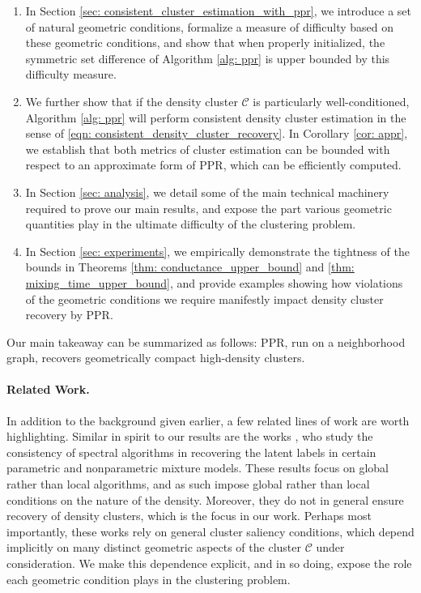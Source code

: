 \documentclass{article}
\newcommand{\1}{\mathbf{1}}
\newcommand{\Cset}{\mathcal{C}}
\newcommand{\ppr}{{\sc PPR}}
\theoremstyle{aldenthm}
\theoremstyle{aldenrmrk}
\begin{document}
\begin{enumerate}
	\item In Section \ref{sec: consistent_cluster_estimation_with_ppr}, we introduce a set of natural geometric conditions, formalize a measure of difficulty based on these geometric conditions, and show that when properly initialized, the symmetric set difference of Algorithm \ref{alg: ppr} is upper bounded by this difficulty measure.
	
	\item We further show that if the density cluster $\Cset$ is particularly well-conditioned, Algorithm \ref{alg: ppr} will perform consistent density cluster estimation in the sense of \eqref{eqn: consistent_density_cluster_recovery}. In Corollary \ref{cor: appr}, we establish that both metrics of cluster estimation can be bounded with respect to an approximate form of \ppr, which can be efficiently computed.
	
	\item In Section \ref{sec: analysis}, we detail some of the main technical machinery required to prove our main results, and expose the part various geometric quantities play in the ultimate difficulty of the clustering problem.
	
	\item In Section \ref{sec: experiments}, we empirically
	demonstrate the tightness of the bounds in Theorems \ref{thm: conductance_upper_bound} and \ref{thm: mixing_time_upper_bound}, and provide examples showing how violations of the geometric conditions we require manifestly
	impact density cluster recovery by \ppr.  
\end{enumerate}

Our main takeaway can be summarized as follows: \ppr, run on a neighborhood graph, recovers geometrically compact high-density clusters.

\paragraph{Related Work. }

In addition to the background given earlier, a few related lines of work are worth
highlighting. Similar in spirit to our results are the works
\citep{shi2009,schiebinger2015}, who study the consistency of
spectral algorithms in recovering the latent labels in certain parametric and
nonparametric mixture models. These results focus on global rather than local
algorithms, and as such impose global rather than local conditions on the nature
of the density. Moreover, they do not in general ensure recovery of density
clusters, which is the focus in our work. Perhaps most importantly, these works rely on general cluster saliency conditions, which depend implicitly on many distinct geometric aspects of the cluster $\Cset$ under consideration. We make this dependence explicit, and in so doing, expose the role each geometric condition plays in the clustering problem.
\end{document}
